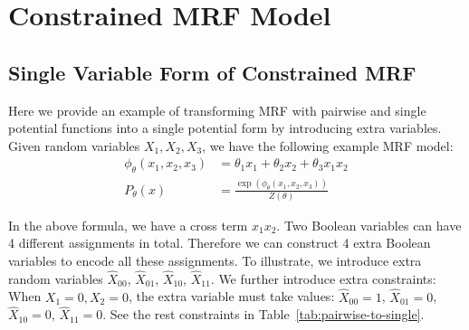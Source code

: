 \documentclass[letterpaper]{article} %
\begin{document}
\section{Constrained MRF Model}\label{appendix:constrain-mrf}

\subsection{Single Variable Form of Constrained MRF}  \label{appendix:svf}
Here we provide an example of transforming MRF with pairwise and single potential functions into a single potential form by introducing extra variables. Given random variables $X_1,X_2,X_3$, we have the following example MRF model:
\begin{align*}
\phi_{\theta}(x_1,x_2,x_3)&=\theta_1 x_1+\theta_2 x_2+\theta_3 x_1 x_2\\
P_{\theta}(x)&=\frac{\exp(\phi_{\theta}(x_1,x_2,x_3))}{Z({\theta})}
\end{align*}

In the above formula, we have a cross term $x_1 x_2$. Two Boolean variables can have 4 different assignments in total. Therefore we can construct 4 extra Boolean variables to encode all these assignments. To illustrate, we introduce extra random variables $\hat{X}_{00}$, $\hat{X}_{01}$, $\hat{X}_{10}$, $\hat{X}_{11}$. We further introduce extra constraints:
 When $X_1=0,X_2=0$, the extra variable must take values: $\hat{X}_{00}=1$, $\hat{X}_{01}=0$, $\hat{X}_{10}=0$, $\hat{X}_{11}=0$. See the rest constraints in Table~\ref{tab:pairwise-to-single}.
\end{document}
